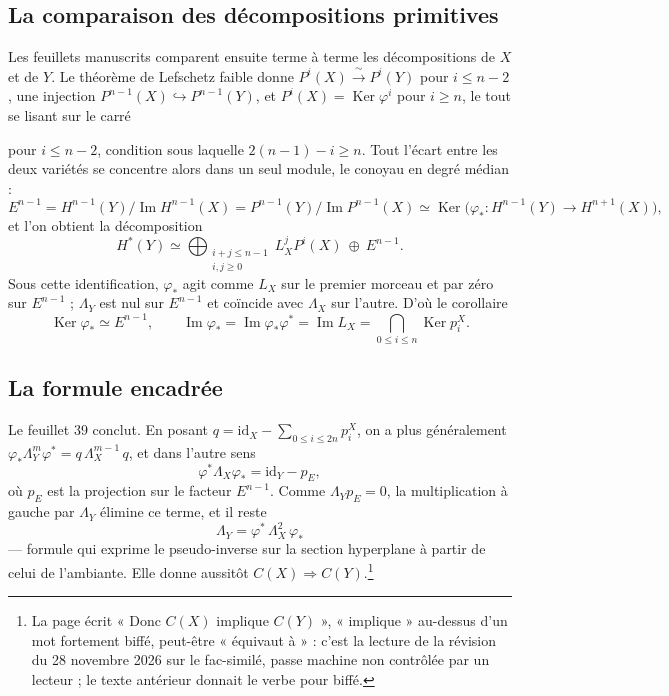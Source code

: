 \documentclass[11pt,a4paper]{article}
\begin{document}
\subsection*{La comparaison des décompositions primitives}

Les feuillets manuscrits comparent ensuite terme à terme les décompositions de
$X$ et de $Y$. Le théorème de Lefschetz faible donne
$P^{i}(X) \xrightarrow{\ \sim\ } P^{i}(Y)$ pour $i \leqslant n-2$, une
injection $P^{n-1}(X) \hookrightarrow P^{n-1}(Y)$, et
$P^{i}(X) = \operatorname{Ker}\varphi^{i}$ pour $i \geqslant n$, le tout se
lisant sur le carré


pour $i \leqslant n-2$, condition sous laquelle $2(n-1) - i \geqslant n$. Tout
l'écart entre les deux variétés se concentre alors dans un seul module, le
conoyau en degré médian :
\[
E^{n-1} = H^{n-1}(Y)/\operatorname{Im} H^{n-1}(X)
= P^{n-1}(Y)/\operatorname{Im} P^{n-1}(X)
\simeq \operatorname{Ker}\bigl(\varphi_{*} \colon H^{n-1}(Y) \to H^{n+1}(X)\bigr),
\]
et l'on obtient la décomposition
\[
H^{*}(Y) \simeq \bigoplus_{\substack{i+j \leqslant n-1 \\ i,j \geqslant 0}}
L_{X}^{j}P^{i}(X) \ \oplus\ E^{n-1} .
\]
Sous cette identification, $\varphi_{*}$ agit comme $L_{X}$ sur le premier
morceau et par zéro sur $E^{n-1}$ ; $\Lambda_{Y}$ est nul sur $E^{n-1}$ et
coïncide avec $\Lambda_{X}$ sur l'autre. D'où le corollaire
\[
\operatorname{Ker}\varphi_{*} \simeq E^{n-1},
\qquad
\operatorname{Im}\varphi_{*} = \operatorname{Im}\varphi_{*}\varphi^{*}
= \operatorname{Im} L_{X} = \bigcap_{0 \leqslant i \leqslant n} \operatorname{Ker} p^{X}_{i} .
\]

\subsection*{La formule encadrée}

Le feuillet 39 conclut. En posant
$q = \mathrm{id}_{X} - \sum_{0 \leqslant i \leqslant 2n}p^{X}_{i}$, on a plus
généralement $\varphi_{*}\Lambda_{Y}^{m}\varphi^{*} = q\,\Lambda_{X}^{m-1}\,q$,
et dans l'autre sens
\[
\varphi^{*}\Lambda_{X}\varphi_{*} = \mathrm{id}_{Y} - p_{E},
\]
où $p_{E}$ est la projection sur le facteur $E^{n-1}$. Comme
$\Lambda_{Y}p_{E} = 0$, la multiplication à gauche par $\Lambda_{Y}$ élimine ce
terme, et il reste
\[
\boxed{\ \Lambda_{Y} = \varphi^{*}\,\Lambda_{X}^{2}\,\varphi_{*}\ }
\]
--- formule qui exprime le pseudo-inverse sur la section hyperplane à partir de
celui de l'ambiante. Elle donne aussitôt $C(X) \Rightarrow
C(Y)$.\footnote{La page écrit « Donc $C(X)$ implique $C(Y)$ », « implique »
au-dessus d'un mot fortement biffé, peut-être « équivaut à » : c'est la lecture
de la révision du 28 novembre 2026 sur le fac-similé, passe machine non contrôlée par un lecteur ; le texte antérieur donnait le verbe pour biffé.}
\end{document}

